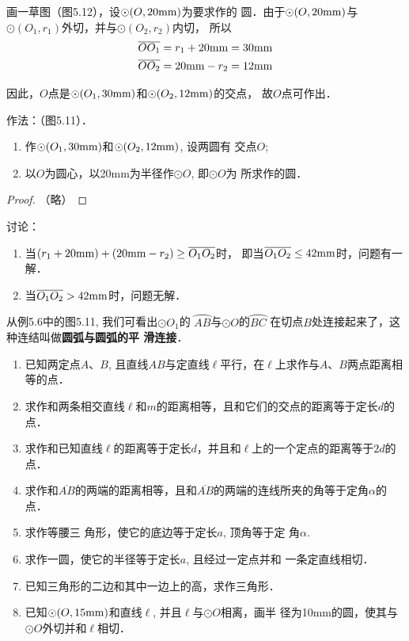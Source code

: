 \begin{analyze}
    画一草图（图5.12），设$\odot (O,20{\rm mm})$为要求作的
圆．由于$\odot (O,20{\rm mm})$与$\odot (O_1,r_1)$外切，并与$\odot (O_2,r_2)$内切，
所以
\[\begin{split}
   \overline{OO_1}&=r_1+20{\rm  mm}=30{\rm mm}\\
   \overline{OO_2}&=20{\rm  mm}-r_2=12{\rm  mm} 
\end{split}\]

因此，$O$点是$\odot (O_1,30{\rm mm})$和$\odot (O_2,12{\rm  mm})$的交点，
故$O$点可作出．
\end{analyze}

作法：（图5.11）．
\begin{enumerate}
    \item 作$\odot (O_1,30{\rm mm})$和$\odot (O_2,12{\rm mm})$, 设两圆有
交点$O$;
\item 以$O$为圆心，以20mm为半径作$\odot O$, 即$\odot O$为
所求作的圆．
\end{enumerate}

\begin{proof}
（略）
\end{proof}

讨论：
\begin{enumerate}
    \item 当$(r_1+20{\rm mm})+(20{\rm mm}-r_2)\ge \overline{O_1O_2}$时，
即当$ \overline{O_1O_2}\le 42{\rm mm}$时，问题有一解．
\item 当$ \overline{O_1O_2}> 42{\rm mm}$时，问题无解．
\end{enumerate}

从例5.6中的图5.11, 我们可看出$\odot O_1$的
$\wideparen{AB}$与$\odot O$的$\wideparen{BC}$
在切点$B$处连接起来了，这种连结叫做\textbf{圆弧与圆弧的平
滑连接}．

\begin{ex}
\begin{enumerate}
    \item 已知两定点$A$、$B$, 且直线$AB$与定直线$\ell$平行，在$\ell$上求作与$A$、$B$两点距离相等的点．
    \item 求作和两条相交直线$\ell$和$m$的距离相等，且和它们的交点的距离等于定长$d$的点．
    \item 求作和已知直线$\ell$的距离等于定长$d$，并且和$\ell$上的一个定点的距离等于$2d$的点．
    \item 求作和$\overline{AB}$的两端的距离相等，且和$\overline{AB}$的两端的连线所夹的角等于定角$\alpha$的点．
    \item 求作等腰三
    角形，使它的底边等于定长$a$, 顶角等于定
    角$\alpha$.
    \item 求作一圆，使它的半径等于定长$a$, 且经过一定点并和
    一条定直线相切．
    \item 已知三角形的二边和其中一边上的高，求作三角形．
    \item 已知$\odot (O,15{\rm mm})$和直线$\ell$, 并且$\ell$与$\odot O$相离，画半
    径为10mm的圆，使其与$\odot O$外切并和$\ell$相切．
\end{enumerate}
\end{ex}

